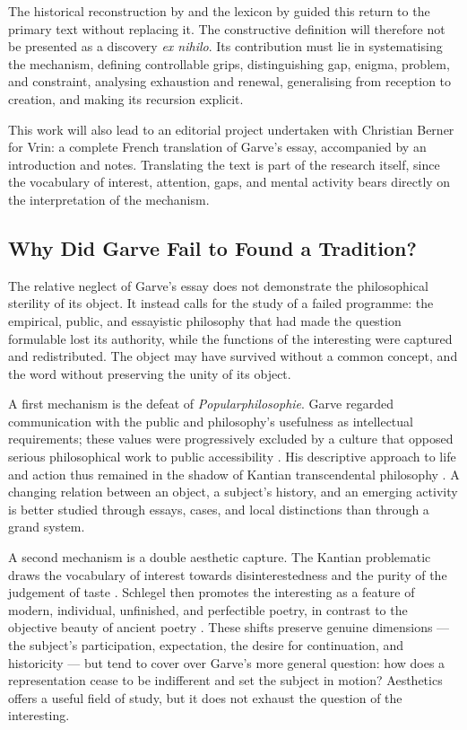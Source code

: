 \documentclass[11pt,a4paper]{article}
\begin{document}
The historical reconstruction by \textcite{nannini2018garve} and the lexicon by
\textcite{nannini2018interesting} guided this return to the primary text without
replacing it. The constructive definition will therefore not be presented as a
discovery \emph{ex nihilo}. Its contribution must lie in systematising the
mechanism, defining controllable grips, distinguishing gap, enigma, problem, and
constraint, analysing exhaustion and renewal, generalising from reception to
creation, and making its recursion explicit.

This work will also lead to an editorial project undertaken with Christian
Berner for Vrin: a complete French translation of Garve's essay,
accompanied by an introduction and notes. Translating the text is part of the
research itself, since the vocabulary of interest, attention, gaps, and mental
activity bears directly on the interpretation of the mechanism.

\subsection{Why Did Garve Fail to Found a Tradition?}

The relative neglect of Garve's essay does not demonstrate the philosophical
sterility of its object. It instead calls for the study of a failed programme:
the empirical, public, and essayistic philosophy that had made the question
formulable lost its authority, while the functions of the interesting were
captured and redistributed. The object may have survived without a common
concept, and the word without preserving the unity of its object.

A first mechanism is the defeat of \emph{Popularphilosophie}. Garve regarded
communication with the public and philosophy's usefulness as intellectual
requirements; these values were progressively excluded by a culture that
opposed serious philosophical work to public accessibility
\parencite{thompson2018garve}. His descriptive approach to life and action thus
remained in the shadow of Kantian transcendental philosophy
\parencite{bachmannmedick2008anziehungskraft}. A changing relation between an
object, a subject's history, and an emerging activity is better studied through
essays, cases, and local distinctions than through a grand system.

A second mechanism is a double aesthetic capture. The Kantian problematic draws
the vocabulary of interest towards disinterestedness and the purity of the
judgement of taste \parencite{kant1993juger}. Schlegel then promotes the
interesting as a feature of modern, individual, unfinished, and perfectible
poetry, in contrast to the objective beauty of ancient poetry
\parencite{schlegel2001study,nannini2018interesting}. These shifts preserve
genuine dimensions --- the subject's participation, expectation, the desire for
continuation, and historicity --- but tend to cover over Garve's more general
question: how does a representation cease to be indifferent and set the subject
in motion? Aesthetics offers a useful field of study, but it does not exhaust
the question of the interesting.
\end{document}
